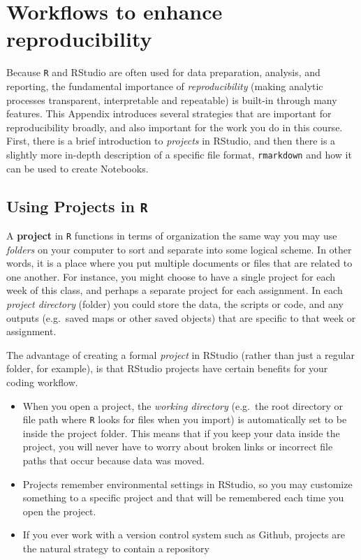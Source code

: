 \documentclass[
]{book}
\newcommand{\passthrough}[1]{#1}
\providecommand{\tightlist}{%
  \setlength{\itemsep}{0pt}\setlength{\parskip}{0pt}}
\begin{document}
\hypertarget{workflows-to-enhance-reproducibility}{%
\section*{Workflows to enhance reproducibility}\label{workflows-to-enhance-reproducibility}}

Because \passthrough{\lstinline!R!} and RStudio are often used for data preparation, analysis, and reporting, the fundamental importance of \emph{reproducibility} (making analytic processes transparent, interpretable and repeatable) is built-in through many features. This Appendix introduces several strategies that are important for reproducibility broadly, and also important for the work you do in this course. First, there is a brief introduction to \emph{projects} in RStudio, and then there is a slightly more in-depth description of a specific file format, \passthrough{\lstinline!rmarkdown!} and how it can be used to create Notebooks.

\hypertarget{using-projects-in-r}{%
\subsection*{\texorpdfstring{Using Projects in \texttt{R}}{Using Projects in R}}\label{using-projects-in-r}}

A \textbf{project} in \passthrough{\lstinline!R!} functions in terms of organization the same way you may use \emph{folders} on your computer to sort and separate into some logical scheme. In other words, it is a place where you put multiple documents or files that are related to one another. For instance, you might choose to have a single project for each week of this class, and perhaps a separate project for each assignment. In each \emph{project directory} (folder) you could store the data, the scripts or code, and any outputs (e.g.~saved maps or other saved objects) that are specific to that week or assignment.

The advantage of creating a formal \emph{project} in RStudio (rather than just a regular folder, for example), is that RStudio projects have certain benefits for your coding workflow.

\begin{itemize}
\tightlist
\item
  When you open a project, the \emph{working directory} (e.g.~the root directory or file path where \passthrough{\lstinline!R!} looks for files when you import) is automatically set to be inside the project folder. This means that if you keep your data inside the project, you will never have to worry about broken links or incorrect file paths that occur because data was moved.
\item
  Projects remember environmental settings in RStudio, so you may customize something to a specific project and that will be remembered each time you open the project.
\item
  If you ever work with a version control system such as Github, projects are the natural strategy to contain a repository
\end{itemize}
\end{document}
